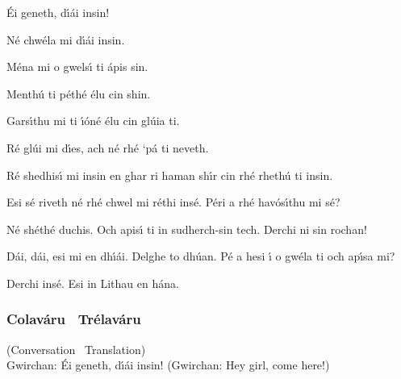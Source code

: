 \begingroup
\fontsize{10pt}{12pt}\selectfont
\begin{leftbubbles}\'{E}i geneth, d\'{\i}\'{a}i insin!\end{leftbubbles}
\begin{rightbubbles}N\'{e} chw\'{e}la mi d\'{\i}\'{a}i insin.\end{rightbubbles}
\begin{leftbubbles}M\'{e}na mi o gwels\'{\i} ti \'{a}pis sin.\end{leftbubbles}
\begin{rightbubbles}Menth\'{u} ti p\'{e}th\'{e} \'{e}lu cin shin.\end{rightbubbles}
\begin{leftbubbles}Gars\'{\i}thu mi ti \'{\i}\'{o}n\'{e} \'{e}lu cin gl\'{u}ia ti.\end{leftbubbles}
\begin{rightbubbles}R\'{e} gl\'{u}i mi d\'{\i}es, ach n\'{e} rh\'{e} ‘p\'{a} ti neveth.\end{rightbubbles}
\begin{leftbubbles}R\'{e} shedhis\'{\i} mi insin en ghar ri haman sh\'{\i}r cin rh\'{e} rheth\'{u} ti insin.\end{leftbubbles}
\begin{rightbubbles}Esi s\'{e} riveth n\'{e} rh\'{e} chwel mi r\'{e}thi ins\'{e}. P\'{e}ri a rh\'{e} hav\'{o}s\'{\i}thu mi s\'{e}?\end{rightbubbles}
\begin{leftbubbles}N\'{e} sh\'{e}th\'{e} duchis. Och apis\'{\i} ti in sudherch-sin tech. Derchi ni sin rochan!\end{leftbubbles}
\begin{rightbubbles}D\'{a}i, d\'{a}i, esi mi en dh\'{\i}\'{a}i. Delghe to dh\'{u}an. P\'{e} a hesi \'{\i} o gw\'{e}la ti och ap\'{\i}sa mi?\end{rightbubbles}
\begin{leftbubbles}Derchi ins\'{e}. Esi in Lithau en h\'{a}na.\end{leftbubbles}
\endgroup

\newpage
\subsubsection{Colav\'{a}ru \textendash\ Tr\'{e}lav\'{a}ru}
(Conversation \textendash\ Translation)\\

Gwirchan: \'{E}i geneth, d\'{\i}\'{a}i insin!
(Gwirchan: Hey girl, come here!)

